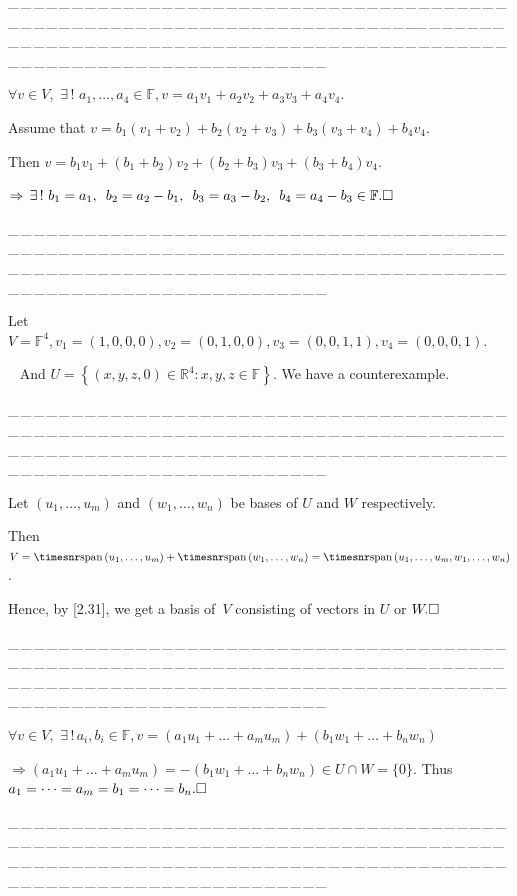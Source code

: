\documentclass[a4paper, 11pt, UTF8]{article}
\def\Spn{{\timesnr\textup{span}}\,}
\def\Fbb{{\mathbb{F}}}
\def\Rbb{{\mathbb{R}}}
\def\ProblemEnding{{\tiny \_\,\_\,\_\,\_\,\_\,\_\,\_\,\_\,\_\,\_\,\_\,\_\,\_\,\_\,\_\,\_\,\_\,\_\,\_\,\_\,\_\,\_\,\_\,\_\,\_\,\_\,\_\,\_\,\_\,\_\,\_\,\_\,\_\,\_\,\_\,\_\,\_\,\_\,\_\,\_\,\_\,\_\,\_\,\_\,\_\,\_\,\_\,\_\,\_\,\_\,\_\,\_\,\_\,\_\,\_\,\_\,\_\,\_\,\_\,\_\,\_\,\_\,\_\,\_\,\_\,\_\,\_\,\_\,\_\,\_\,\_\_\,\_\,\_\,\_\,\_\,\_\,\_\,\_\,\_\,\_\,\_\,\_\,\_\,\_\,\_\,\_\,\_\,\_\,\_\,\_\,\_\,\_\,\_\,\_\,\_\,\_\,\_\,\_\,\_\,\_\,\_\,\_\,\_\,\_\,\_\,\_\,\_\,\_\,\_\,\_\,\_\,\_\,\_\,\_\,\_\,\_\,\_\,\_\,\_\,\_\,\_\,\_\,\_\,\_\,\_\,\_\,\_\,\_\,\_\,\_\,\_\,\_\,\_\,\_\,\_\,\_\,\_\,\_\,\_\,\_\,\_}}
\begin{document}
\begin{large}
\par
\ProblemEnding\par

$\forall v\in V,\,\,\exists\,!\,\,a_1,\dots,a_4\in\Fbb,v=a_1 v_1+a_2 v_2+a_3 v_3+a_4 v_4.$\par\quad
Assume that $v=b_1(v_1+v_2)+b_2(v_2+v_3)+b_3(v_3+v_4)+b_4 v_4$.\par\quad
Then $v=b_1 v_1+(b_1+b_2)v_2+(b_2+b_3)v_3+(b_3+b_4)v_4$.\par\quad
$\Rightarrow\,\exists\,!\,\,b_1=a_1,\,\,\,b_2=a_2-b_1,\,\,\,b_3=a_3-b_2,\,\,\,b_4=a_4-b_3\in\Fbb.\hfill\square$
\par
\ProblemEnding\par

Let $V=\Fbb^4,v_1=(1,0,0,0),v_2=(0,1,0,0),v_3=(0,0,1,1),v_4=(0,0,0,1).$\par\qquad\quad\quad\,\,\,
And $U=\left\{(x,y,z,0)\in\Rbb^4:x,y,z\in\Fbb\right\}$. We have a counterexample.\par
\ProblemEnding\par

Let $(u_1,\dots,u_m)$ and $(w_1,\dots,w_n)$ be bases of $U$ and $W$ respectively.\par\quad
Then $V=\Spn(u_1,\dots,u_m)+\Spn(w_1,\dots,w_n)=\Spn(u_1,\dots,u_m,w_1,\dots,w_n)$.\par\quad
Hence, by [2.31], we get a basis of \,$V$ consisting of vectors in $U$ or $W.\hfill\square$\par
\ProblemEnding\par

$\forall v\in V,\,\,\exists\,!\,a_i,b_i\in\Fbb,v=(a_1 u_1+\dots+a_m u_m)+(b_1 w_1+\dots+b_n w_n)$\par\quad
$\Rightarrow (a_1 u_1+\dots+a_m u_m)=-(b_1 w_1+\dots+b_n w_n)\in U\cap W=\{0\}$. Thus $a_1=\dots=a_m=b_1=\dots=b_n.\hfill\square$\par
\ProblemEnding\par


\end{large}
\end{document}
